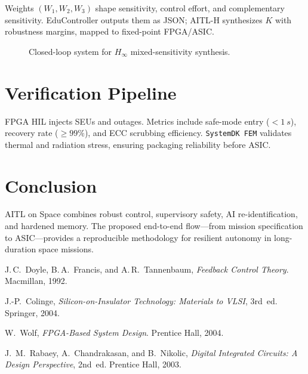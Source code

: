 \documentclass[conference]{IEEEtran}
\begin{document}
Weights $(W_1,W_2,W_3)$ shape sensitivity, control effort, and complementary sensitivity. EduController outputs them as JSON; AITL-H synthesizes $K$ with robustness margins, mapped to fixed-point FPGA/ASIC.

\begin{figure}[t]
\centering
{}
\caption{Closed-loop system for $H_\infty$ mixed-sensitivity synthesis.}
\label{fig:loop}
\end{figure}

\section{Verification Pipeline}
FPGA HIL injects SEUs and outages. Metrics include safe-mode entry ($<\SI{1}{s}$), recovery rate ($\ge 99\%$), and ECC scrubbing efficiency. \texttt{SystemDK FEM} validates thermal and radiation stress, ensuring packaging reliability before ASIC.

\section{Conclusion}
AITL on Space combines robust control, supervisory safety, AI re-identification, and hardened memory. The proposed end-to-end flow—from mission specification to ASIC—provides a reproducible methodology for resilient autonomy in long-duration space missions.

\begin{thebibliography}{99}
J.\,C.~Doyle, B.\,A.~Francis, and A.\,R.~Tannenbaum,
\emph{Feedback Control Theory}. Macmillan, 1992.

J.-P.~Colinge, \emph{Silicon-on-Insulator Technology: Materials to VLSI}, 3rd~ed. Springer, 2004.

W.~Wolf, \emph{FPGA-Based System Design}. Prentice Hall, 2004.

J.~M.~Rabaey, A.~Chandrakasan, and B.~Nikolic,
\emph{Digital Integrated Circuits: A Design Perspective}, 2nd~ed. Prentice Hall, 2003.
\end{thebibliography}
\end{document}
